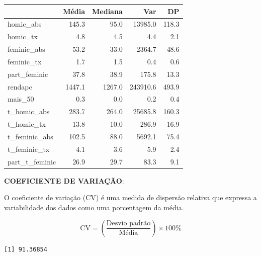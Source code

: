 \documentclass[
  letterpaper,
  DIV=11,
  numbers=noendperiod]{scrreprt}
\newenvironment{Shaded}{\begin{snugshade}}{\end{snugshade}}
\newcommand{\AttributeTok}[1]{\textcolor[rgb]{0.40,0.45,0.13}{#1}}
\newcommand{\CommentTok}[1]{\textcolor[rgb]{0.37,0.37,0.37}{#1}}
\newcommand{\ConstantTok}[1]{\textcolor[rgb]{0.56,0.35,0.01}{#1}}
\newcommand{\DecValTok}[1]{\textcolor[rgb]{0.68,0.00,0.00}{#1}}
\newcommand{\FunctionTok}[1]{\textcolor[rgb]{0.28,0.35,0.67}{#1}}
\newcommand{\NormalTok}[1]{\textcolor[rgb]{0.00,0.23,0.31}{#1}}
\newcommand{\SpecialCharTok}[1]{\textcolor[rgb]{0.37,0.37,0.37}{#1}}
\begin{document}
\begin{table}
\centering
\begin{tabular}[t]{l|r|r|r|r}
\hline
  & Média & Mediana & Var & DP\\
\hline
homic\_abs & 145.3 & 95.0 & 13985.0 & 118.3\\
\hline
homic\_tx & 4.8 & 4.5 & 4.4 & 2.1\\
\hline
feminic\_abs & 53.2 & 33.0 & 2364.7 & 48.6\\
\hline
feminic\_tx & 1.7 & 1.5 & 0.4 & 0.6\\
\hline
part\_feminic & 37.8 & 38.9 & 175.8 & 13.3\\
\hline
rendapc & 1447.1 & 1267.0 & 243910.6 & 493.9\\
\hline
mais\_50 & 0.3 & 0.0 & 0.2 & 0.4\\
\hline
t\_homic\_abs & 283.7 & 264.0 & 25685.8 & 160.3\\
\hline
t\_homic\_tx & 13.8 & 10.0 & 286.9 & 16.9\\
\hline
t\_feminic\_abs & 102.5 & 88.0 & 5692.1 & 75.4\\
\hline
t\_feminic\_tx & 4.1 & 3.6 & 5.9 & 2.4\\
\hline
part\_t\_feminic & 26.9 & 29.7 & 83.3 & 9.1\\
\hline
\end{tabular}
\end{table}

\textbf{COEFICIENTE DE VARIAÇÃO}:

O coeficiente de variação (CV) é uma medida de dispersão relativa que
expressa a variabilidade dos dados como uma porcentagem da média.

\[\text{CV} = \left( \frac{\text{Desvio padrão}}{\text{Média}} \right) \times 100\%\]

\begin{Shaded}
\end{Shaded}

\begin{verbatim}
[1] 91.36854
\end{verbatim}
\end{document}
